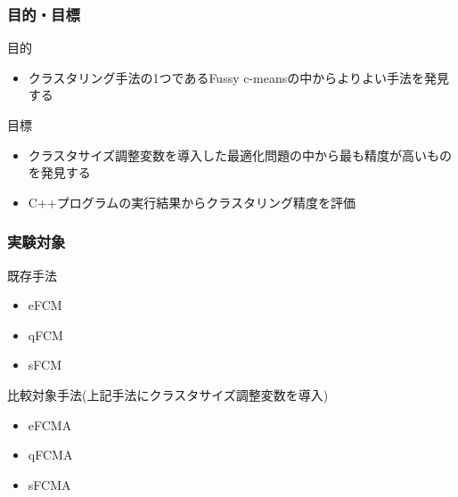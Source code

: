 \documentclass[13pt,dvipdfmx]{beamer}
\begin{document}
\begin{frame}\frametitle{目的・目標}
\begin{block}{目的}
\begin{itemize}
\item クラスタリング手法の1つであるFussy c-meansの中からよりよい手法を発見する
\end{itemize}
\end{block}
\vspace{4mm}
\begin{block}{目標}
  \begin{itemize}
  \item クラスタサイズ調整変数を導入した最適化問題の中から最も精度が高いものを発見する
  \item C++プログラムの実行結果からクラスタリング精度を評価
\end{itemize}
\end{block}
\end{frame}

\begin{frame}\frametitle{実験対象}
  \begin{block}{既存手法}
   \begin{itemize}
    \item eFCM
    \item qFCM
    \item sFCM
   \end{itemize}
  \end{block}
 \begin{block}{比較対象手法(上記手法にクラスタサイズ調整変数を導入)}
   \begin{itemize}
    \item eFCMA
    \item qFCMA
    \item sFCMA
   \end{itemize}
 \end{block}
\end{frame}
\end{document}
